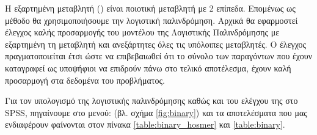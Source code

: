 \documentclass{assignment}
\begin{document}
\begin{Assignment}[Μέρος Ε]

Η εξαρτημένη μεταβλητή () είναι ποιοτική μεταβλητή με 2 επίπεδα. Επομένως ως μέθοδο θα χρησιμοποιήσουμε την λογιστική παλινδρόμηση. Αρχικά θα εφαρμοστεί έλεγχος καλής προσαρμογής του μοντέλου της Λογιστικής Παλινδρόμησης με εξαρτημένη τη μεταβλητή  και ανεξάρτητες όλες τις υπόλοιπες μεταβλητές. Ο έλεγχος  πραγματοποιείται έτσι ώστε να επιβεβαιωθεί ότι το σύνολο των παραγόντων  που έχουν καταγραφεί ως υποψήφιοι να επιδρούν πάνω στο τελικό αποτέλεσμα, έχουν καλή προσαρμογή στα δεδομένα του προβλήματος.

Για τον υπολογισμό της λογιστικής παλινδρόμησης καθώς και του ελέγχου της στο SPSS, πηγαίνουμε στο μενού:  (βλ. σχήμα \ref{fig:binary}) και τα αποτελέσματα που μας ενδιαφέρουν φαίνονται στον πίνακα \ref{table:binary_hosmer} και \ref{table:binary}.


\end{Assignment}
\end{document}
